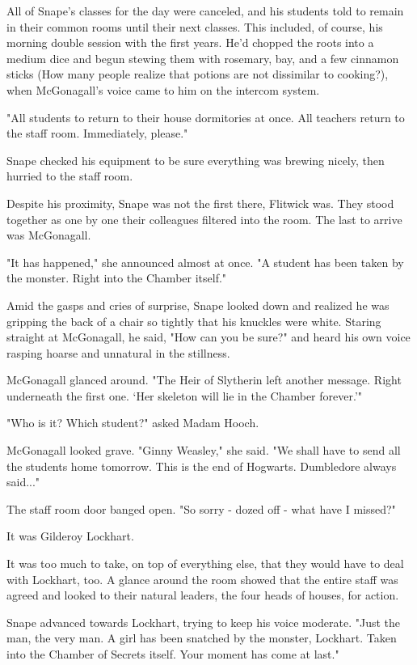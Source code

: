 \documentclass[a4paper,11pt]{article}
\begin{document}
All of Snape's classes for the day were canceled, and his students told to remain in their common rooms until their next classes. This included, of course, his morning double session with the first years. He'd chopped the roots into a medium dice and begun stewing them with rosemary, bay, and a few cinnamon sticks (How many people realize that potions are not dissimilar to cooking?), when McGonagall's voice came to him on the intercom system.

"All students to return to their house dormitories at once. All teachers return to the staff room. Immediately, please."

Snape checked his equipment to be sure everything was brewing nicely, then hurried to the staff room.

Despite his proximity, Snape was not the first there, Flitwick was. They stood together as one by one their colleagues filtered into the room. The last to arrive was McGonagall.

"It has happened," she announced almost at once. "A student has been taken by the monster. Right into the Chamber itself."

Amid the gasps and cries of surprise, Snape looked down and realized he was gripping the back of a chair so tightly that his knuckles were white. Staring straight at McGonagall, he said, "How can you be sure?" and heard his own voice rasping hoarse and unnatural in the stillness.

McGonagall glanced around. "The Heir of Slytherin left another message. Right underneath the first one. `Her skeleton will lie in the Chamber forever.'"

"Who is it? Which student?" asked Madam Hooch.

McGonagall looked grave. "Ginny Weasley," she said. "We shall have to send all the students home tomorrow. This is the end of Hogwarts. Dumbledore always said..."

The staff room door banged open. "So sorry - dozed off - what have I missed?"

It was Gilderoy Lockhart.

It was too much to take, on top of everything else, that they would have to deal with Lockhart, too. A glance around the room showed that the entire staff was agreed and looked to their natural leaders, the four heads of houses, for action.

Snape advanced towards Lockhart, trying to keep his voice moderate. "Just the man, the very man. A girl has been snatched by the monster, Lockhart. Taken into the Chamber of Secrets itself. Your moment has come at last."
\end{document}
